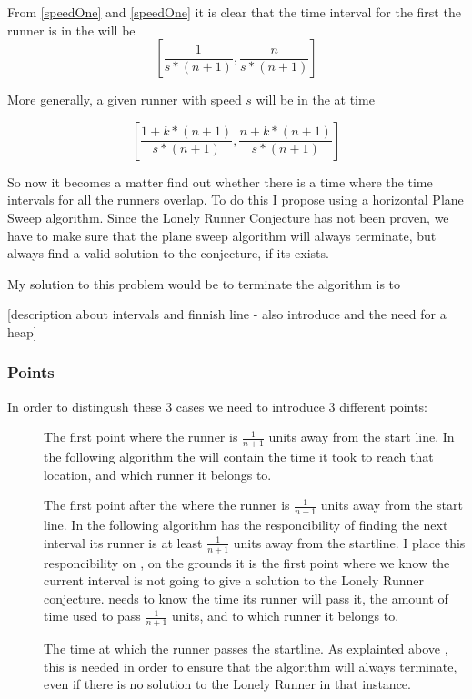 From \ref{speedOne} and \ref{speedOne} it is clear that the time interval for the first the runner is in the \zone will be 
\begin{displaymath}
\left[\frac{1}{s * (n+1)}, \frac{n}{s * (n+1)}\right]
\end{displaymath}

More generally, a given runner with speed $s$ will be in the \zone at time 

\begin{displaymath}
\left[\frac{1 + k * (n+1)}{s * (n+1)}, \frac{n + k * (n+1)}{s * (n+1)}\right] 
\end{displaymath}

So now it becomes a matter find out whether there is a time where the time intervals for all the runners overlap. To do this I propose using a horizontal Plane Sweep algorithm. Since the Lonely Runner Conjecture has not been proven, we have to make sure that the plane sweep algorithm will always terminate, but always find a valid solution to the conjecture, if its exists.

My solution to this problem would be to terminate the algorithm is to   

[description about intervals and finnish line - also introduce and the need for a heap]

\subsubsection{Points}

In order to distingush these 3 cases we need to introduce 3 different points:
\begin{description}
\item[\comStart] The first point where the runner is $\frac{1}{n + 1}$ units away from the start line. In the following algorithm the \comStart will contain the time it took to reach that location, and which runner it belongs to.
\item[\comEnd] The first point after the \comStart where the runner is $\frac{1}{n + 1}$ units away from the start line. In the following algorithm \comEnd has the responcibility of finding the next interval its runner is at least $\frac{1}{n+1}$ units away from the startline. I place this responcibility on \comEnd, on the grounds it is the first point where we know the current interval is not going to give a solution to the Lonely Runner conjecture. \comEnd needs to know the time its runner will pass it, the amount of time used to pass $\frac{1}{n+1}$ units, and to which runner it belongs to.
\item[\comFin] The time at which the runner passes the startline. As explainted above , this is needed in order to ensure that the algorithm will always terminate, even if there is no solution to the Lonely Runner in that instance.
\end{description}

